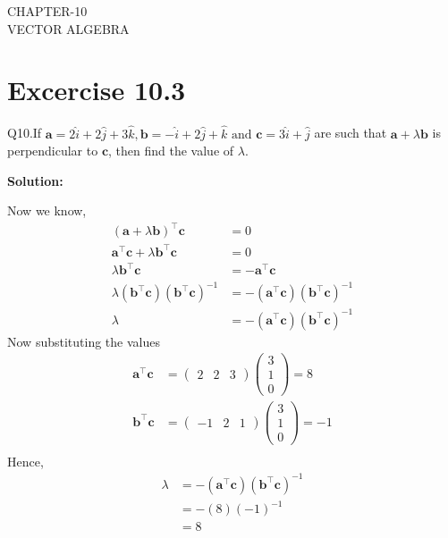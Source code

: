 \documentclass[12pt]{article}
\newcommand{\solution}{\noindent \textbf{Solution: }}
\newcommand{\myvec}[1]{\ensuremath{\begin{pmatrix}#1\end{pmatrix}}}
\let\vec\mathbf
\begin{document}
\begin{center}
\textbf\large{CHAPTER-10 \\ VECTOR ALGEBRA}

\end{center}
\section*{Excercise 10.3}

Q10.If $\vec{a} = 2\hat{i}+2\hat{j}+3\hat{k}, \vec{b} = -\hat{i}+2\hat{j}+\hat{k} \text{ and } \vec{c} = 3\hat{i}+\hat{j}$ are such that $\vec{a}+\lambda \vec{b}$ is perpendicular to $\vec{c}$, then find the value of $\lambda$.

\solution

Now we know,
\begin{align}
	(\vec{a}+\lambda \vec{b})^{\top} \vec{c} &= 0\\
	\vec{a}^{\top}\vec{c}+\lambda \vec{b}^{\top}\vec{c}&=0\\
	\lambda \vec{b}^{\top}\vec{c}&=-\vec{a}^{\top}\vec{c}\\
	\lambda(\vec{b}^{\top}\vec{c})(\vec{b}^{\top}\vec{c})^{-1}&=-(\vec{a}^{\top}\vec{c})(\vec{b}^{\top}\vec{c})^{-1}\\
	\lambda&=-(\vec{a}^{\top}\vec{c})(\vec{b}^{\top}\vec{c})^{-1}
\end{align}
Now substituting the values
\begin{align}
	\vec{a}^{\top}\vec{c}&=\myvec{2&2&3} \myvec{3\\1\\0} = 8\\
	\vec{b}^{\top}\vec{c}&=\myvec{-1&2&1} \myvec{3\\1\\0} = -1\\
\end{align}
Hence,
\begin{align}
	\lambda&=-(\vec{a}^{\top}\vec{c})(\vec{b}^{\top}\vec{c})^{-1}\\
	&=-(8)(-1)^{-1}\\
	&=8
\end{align}
\end{document}
